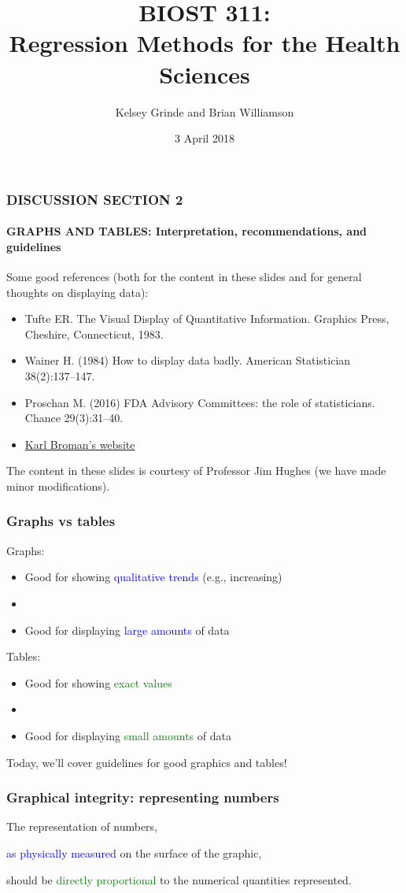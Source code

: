 \documentclass[12pt, 
hyperref={colorlinks=true, linkcolor=blue, urlcolor=cyan}]{beamer}
\title{BIOST 311: \\ Regression Methods for the Health Sciences}
\author{Kelsey Grinde and Brian Williamson}
\institute{UW Biostatistics}
\date{3 April 2018}
\begin{document}
\begin{frame}
\titlepage\thispagestyle{empty}
\end{frame}


\begin{frame}
\frametitle{DISCUSSION SECTION 2 }
\framesubtitle{GRAPHS AND TABLES: Interpretation, recommendations, and guidelines}

{\small

Some good references (both for the content in these slides and for general thoughts on displaying data):
{\scriptsize
\begin{itemize}
\item Tufte ER. The Visual Display of Quantitative Information. Graphics Press, Cheshire, Connecticut, 1983.
\item Wainer H. (1984) How to display data badly. American Statistician 38(2):137--147.
\item Proschan M. (2016) FDA Advisory Committees: the role of statisticians. Chance 29(3):31--40.
\item \href{https://www.biostat.wisc.edu/~kbroman/topten\_worstgraphs/}{Karl Broman's website}
\end{itemize}
}

The content in these slides is courtesy of Professor Jim Hughes (we have made minor modifications). 
}
\end{frame}

\begin{frame}
\frametitle{Graphs vs tables}
Graphs:
\begin{itemize}
\item Good for showing \textcolor{blue}{qualitative trends} (e.g., increasing)
\item[]
\item Good for displaying \textcolor{blue}{large amounts} of data
\end{itemize}

Tables:
\begin{itemize}
\item Good for showing \textcolor{green}{exact values}
\item[]
\item Good for displaying \textcolor{green}{small amounts} of data
\end{itemize}

Today, we'll cover guidelines for good graphics and tables!
\end{frame}

\begin{frame}
\frametitle{Graphical integrity: representing numbers}

The representation of numbers, 

\textcolor{blue}{as physically measured} on the surface of the graphic, 

should be \textcolor{green}{directly proportional} to the numerical quantities represented.

\end{frame}
\end{document}
